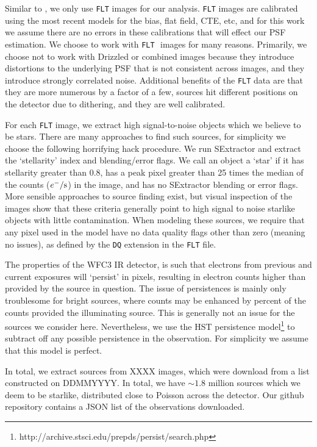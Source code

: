 \documentclass[12pt,letterpaper,preprint]{aastex}
\newcommand{\FLT}{\texttt{FLT}\,\,}
\begin{document}
Similar to \citet{anderson06}, we only use \FLT images for our analysis.  \FLT images are calibrated 
using the most recent models for the bias, flat field, CTE, etc, and for this work we assume there are 
no errors in these calibrations that will effect our PSF estimation.  We choose to work with \FLT
images for many reasons.  Primarily, we choose not to work with Drizzled or combined images
because they introduce distortions to the underlying PSF that is not consistent across images, and 
they introduce strongly correlated noise.  Additional benefits of the \FLT data are that they are 
more numerous by a factor of a few, sources hit different positions on the detector due to dithering, 
and they are well calibrated.  

For each \FLT image, we extract high signal-to-noise objects which we believe to be stars.  There 
are many approaches to find such sources, for simplicity we choose the following horrifying hack 
procedure.  We run SExtractor \citep{bertin} and extract the `stellarity' index and blending/error 
flags.  We call an object a `star' if it has stellarity greater than 0.8, has a peak pixel greater than 25
times the median of the counts ($e^- / \rm{s}$) in the image, and has no SExtractor blending or 
error flags.  More sensible approaches to source finding exist, but visual inspection of the images 
show that these criteria generally point to high signal to noise starlike objects with little contamination.
When modeling these sources, we require that any pixel used in the model have no data quality 
flags other than zero (meaning no issues), as defined by the \texttt{DQ} extension in the \FLT file.

The properties of the WFC3 IR detector, is such that electrons from previous and current exposures 
will `persist' in pixels, resulting in electron counts higher than provided by the source in question.  
The issue of persistences is mainly only troublesome for bright sources, where counts may be 
enhanced by  percent of the counts provided the illuminating source.  This is generally 
not an issue for the sources we consider here.  Nevertheless, we use the HST persistence 
model\footnote{http://archive.stsci.edu/prepds/persist/search.php} to subtract off any possible 
persistence in the observation.  For simplicity we assume that this model is perfect.

In total, we extract sources from XXXX images, which were download from a list constructed on 
DDMMYYYY.  In total, we have $\sim1.8$ million sources which we deem to be starlike, distributed 
close to Poisson across the detector.  Our github repository contains a JSON list of the observations 
downloaded.
\end{document}
